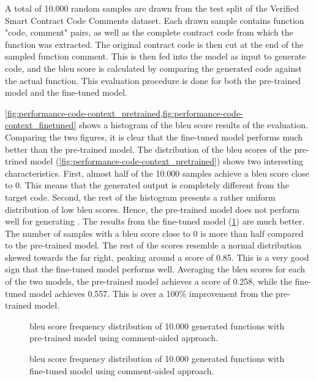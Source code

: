 A total of 10.000 random samples are drawn from the test split of the Verified Smart Contract Code Comments dataset. Each drawn sample contains function "code, comment" pairs, as well as the complete contract code from which the function was extracted. The original contract code is then cut at the end of the sampled function comment. This is then fed into the model as input to generate code, and the \gls{bleu} score is calculated by comparing the generated code against the actual function. This evaluation procedure is done for both the pre-trained model and the fine-tuned model. 

\cref{fig:performance-code-context_pretrained,fig:performance-code-context_finetuned} shows a histogram of the \acrshort{bleu} score results of the evaluation. Comparing the two figures, it is clear that the fine-tuned model performs much better than the pre-trained model. The distribution of the \acrshort{bleu} scores of the pre-trined model (\cref{fig:performance-code-context_pretrained}) shows two interesting characteristics. First, almost half of the 10.000 samples achieve a \acrshort{bleu} score close to 0. This means that the generated output is completely different from the target code. Second, the rest of the histogram presents a rather uniform distribution of low \acrshort{bleu} scores. Hence, the pre-trained model does not perform well for generating . The results from the fine-tuned model (\cref{fig:performance-code-context_finetuned}) are much better. The number of samples with a \acrshort{bleu} score close to 0 is more than half compared to the pre-trained model. The rest of the scores resemble a normal distribution skewed towards the far right, peaking around a score of 0.85. This is a very good sign that the fine-tuned model performs well. Averaging the \acrshort{bleu} scores for each of the two models, the pre-trained model achieves a score of 0.258, while the fine-tuned model achieves 0.557. This is over a 100\% improvement from the pre-trained model.

\begin{figure}[htp]
    \centering
    
    \caption{\acrshort{bleu} score frequency distribution of 10.000 generated functions with pre-trained model using comment-aided approach.}
    \label{fig:performance-code-context_pretrained}
    \vspace*{\floatsep}%
    
    \caption{\acrshort{bleu} score frequency distribution of 10.000 generated functions with fine-tuned model using comment-aided approach.}
    \label{fig:performance-code-context_finetuned}
\end{figure}


